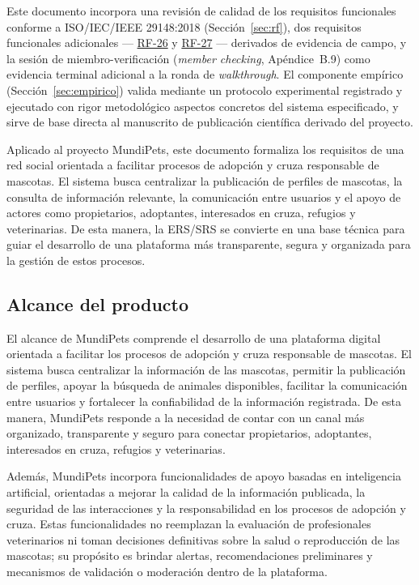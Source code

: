 \documentclass[journal,onecolumn]{IEEEtran}
\begin{document}
	Este documento incorpora una revisión de calidad de los
	requisitos funcionales conforme a ISO/IEC/IEEE 29148:2018 (Sección~\ref{sec:rf}),
	dos requisitos funcionales adicionales --- \hyperref[tab:RF-26]{RF-26} y \hyperref[tab:RF-27]{RF-27} --- derivados de
	evidencia de campo, y la sesión de miembro-verificación
	(\emph{member checking}, Apéndice~B.9) como evidencia terminal
	adicional a la ronda de \emph{walkthrough}. El componente empírico
	(Sección~\ref{sec:empirico}) valida mediante un protocolo experimental
	registrado y ejecutado con rigor metodológico aspectos concretos del
	sistema especificado, y sirve de base directa al manuscrito de
	publicación científica derivado del proyecto.
	
	Aplicado al proyecto MundiPets, este documento formaliza los requisitos de una
	red social orientada a facilitar procesos de adopción y cruza responsable de
	mascotas. El sistema busca centralizar la publicación de perfiles de mascotas,
	la consulta de información relevante, la comunicación entre usuarios y el
	apoyo de actores como propietarios, adoptantes, interesados en cruza, refugios
	y veterinarias. De esta manera, la ERS/SRS se convierte en una base técnica
	para guiar el desarrollo de una plataforma más transparente, segura y
	organizada para la gestión de estos procesos.
	
	\subsection{Alcance del producto}
	\label{sec:alcance}
	
	El alcance de MundiPets comprende el desarrollo de una plataforma digital
	orientada a facilitar los procesos de adopción y cruza responsable de
	mascotas. El sistema busca centralizar la información de las mascotas,
	permitir la publicación de perfiles, apoyar la búsqueda de animales
	disponibles, facilitar la comunicación entre usuarios y fortalecer la
	confiabilidad de la información registrada. De esta manera, MundiPets responde
	a la necesidad de contar con un canal más organizado, transparente y seguro
	para conectar propietarios, adoptantes, interesados en cruza, refugios y
	veterinarias.
	
	Además, MundiPets incorpora funcionalidades de apoyo basadas en inteligencia
	artificial, orientadas a mejorar la calidad de la información publicada, la
	seguridad de las interacciones y la responsabilidad en los procesos de
	adopción y cruza. Estas funcionalidades no reemplazan la evaluación de
	profesionales veterinarios ni toman decisiones definitivas sobre la salud o
	reproducción de las mascotas; su propósito es brindar alertas, recomendaciones
	preliminares y mecanismos de validación o moderación dentro de la plataforma.
	
\end{document}
